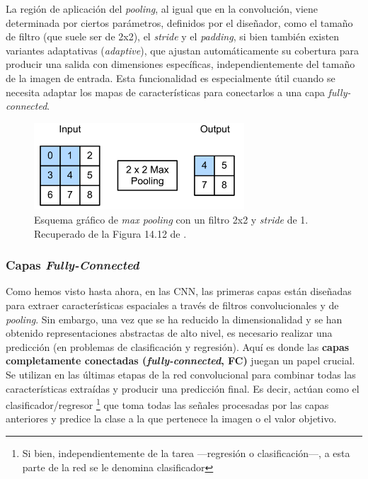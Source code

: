 La región de aplicación del \textit{pooling}, al igual que en la convolución, viene determinada por ciertos 
parámetros, definidos por el diseñador, como el tamaño de filtro (que suele ser de 2x2), el \textit{stride} 
y el \textit{padding}, si bien también existen variantes  adaptativas (\textit{adaptive}), que ajustan
automáticamente su cobertura para producir una salida con dimensiones específicas, independientemente del 
tamaño de la imagen de entrada. Esta funcionalidad es especialmente útil cuando se necesita adaptar los mapas
de características para conectarlos a una capa \textit{fully-connected}. 

\begin{figure}[htbp]
    \centering
    \includegraphics[width=0.7\textwidth]{capitulos/cap_02/imagenes/max_pooling.png}
    \caption{
        Esquema gráfico de \textit{max pooling} con un filtro 2x2 y \textit{stride} de 1.
        Recuperado de la Figura 14.12 de \cite{murphy2022}.
    } 
    \label{fig:max_pooling}
\end{figure}



\subsubsection{Capas \textit{Fully-Connected}}

Como hemos visto hasta ahora, en las \acrshort{CNN}, las primeras capas están diseñadas para extraer características espaciales a través de filtros convolucionales y de \textit{pooling}. Sin embargo, una vez que se ha reducido la dimensionalidad y se han obtenido representaciones abstractas de alto nivel, es necesario realizar una predicción (en problemas de clasificación y regresión). Aquí es donde las \textbf{capas completamente conectadas (\textit{fully-connected}, \acrshort{FC})} juegan un papel crucial. Se utilizan en las últimas etapas de la red convolucional para combinar todas las características extraídas y producir una predicción final. Es decir, actúan como el clasificador/regresor%
\footnote{
    Si bien, independientemente de la tarea ---regresión o clasificación---, a esta parte de la red se le 
    denomina clasificador
} 
que toma todas las señales procesadas por las capas anteriores y predice la clase a la que pertenece la imagen o el valor objetivo. 


